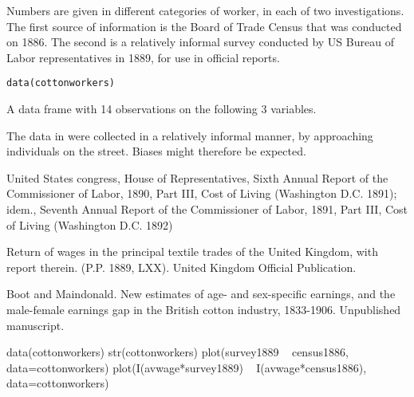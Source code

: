 \begin{Description}\relax
Numbers are given in different categories of worker, in each of
two investigations.  The first source of information is the
Board of Trade Census that was conducted on 1886.  The second
is a relatively informal survey conducted by US Bureau of
Labor representatives in 1889, for use in official reports.
\end{Description}
\begin{Usage}
\begin{verbatim}data(cottonworkers)\end{verbatim}
\end{Usage}
\begin{Format}\relax
A data frame with 14 observations on the following 3 variables.
\end{Format}
\begin{Details}\relax
The data in  were collected in a relatively informal
manner, by approaching individuals on the street.  Biases might
therefore be expected.
\end{Details}
\begin{Source}\relax
United States congress, House of Representatives, Sixth Annual Report
of the Commissioner of Labor, 1890, Part III, Cost of Living
(Washington D.C. 1891); idem.,  Seventh Annual Report
of the Commissioner of Labor, 1891, Part III, Cost of Living
(Washington D.C. 1892)

Return of wages in the principal textile trades of the United Kingdom,
with report therein. (P.P. 1889, LXX). United Kingdom Official
Publication.
\end{Source}
\begin{References}\relax
Boot and Maindonald. New estimates of age- and sex-specific earnings,
and the male-female earnings gap in the British cotton industry,
1833-1906.  Unpublished manuscript.
\end{References}
\begin{Examples}
\begin{ExampleCode}
data(cottonworkers)
str(cottonworkers)
plot(survey1889 ~ census1886, data=cottonworkers)
plot(I(avwage*survey1889) ~ I(avwage*census1886), data=cottonworkers)
\end{ExampleCode}
\end{Examples}

